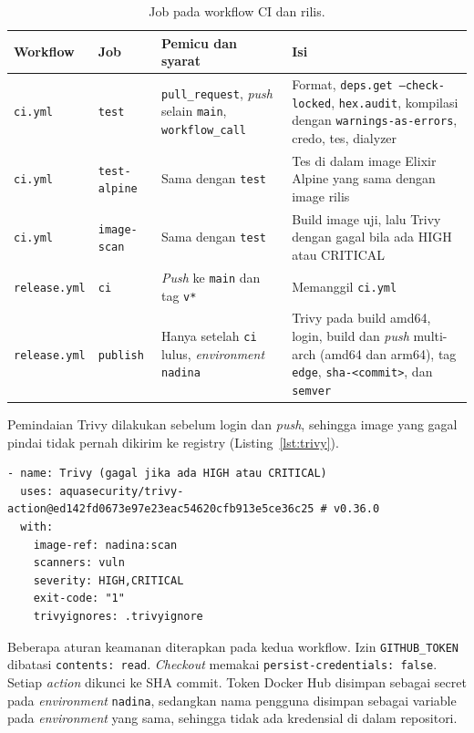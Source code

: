 \begin{table}[H]
\centering
{\small
\begin{tabular}{@{}p{2.6cm}p{2.6cm}p{4.4cm}p{5.4cm}@{}}
\toprule
Workflow & Job & Pemicu dan syarat & Isi \\
\midrule
\texttt{ci.yml} & \texttt{test} & \texttt{pull\_request}, \textit{push} selain \texttt{main}, \texttt{workflow\_call} &
Format, \texttt{deps.get --check-locked}, \texttt{hex.audit}, kompilasi dengan \texttt{warnings-as-errors}, credo, tes, dialyzer \\
\texttt{ci.yml} & \texttt{test-alpine} & Sama dengan \texttt{test} &
Tes di dalam image Elixir Alpine yang sama dengan image rilis \\
\texttt{ci.yml} & \texttt{image-scan} & Sama dengan \texttt{test} &
Build image uji, lalu Trivy~\cite{trivy} dengan gagal bila ada HIGH atau CRITICAL \\
\texttt{release.yml} & \texttt{ci} & \textit{Push} ke \texttt{main} dan tag \texttt{v*} &
Memanggil \texttt{ci.yml} \\
\texttt{release.yml} & \texttt{publish} & Hanya setelah \texttt{ci} lulus, \textit{environment} \texttt{nadina} &
Trivy pada build amd64, login, build dan \textit{push} multi-arch (amd64 dan arm64), tag \texttt{edge}, \texttt{sha-<commit>}, dan \texttt{semver} \\
\bottomrule
\end{tabular}}
\caption{Job pada workflow CI dan rilis.}
\label{tab:ci}
\end{table}

Pemindaian Trivy dilakukan sebelum login dan \textit{push}, sehingga image yang gagal pindai tidak
pernah dikirim ke registry (Listing~\ref{lst:trivy}).

\begin{lstlisting}[basicstyle=\ttfamily\footnotesize,caption={Gerbang Trivy pada job \texttt{publish}},label={lst:trivy},numbers=none]
- name: Trivy (gagal jika ada HIGH atau CRITICAL)
  uses: aquasecurity/trivy-action@ed142fd0673e97e23eac54620cfb913e5ce36c25 # v0.36.0
  with:
    image-ref: nadina:scan
    scanners: vuln
    severity: HIGH,CRITICAL
    exit-code: "1"
    trivyignores: .trivyignore
\end{lstlisting}

Beberapa aturan keamanan diterapkan pada kedua workflow. Izin \texttt{GITHUB\_TOKEN} dibatasi
\texttt{contents: read}. \textit{Checkout} memakai \texttt{persist-credentials: false}. Setiap
\textit{action} dikunci ke SHA commit. Token Docker Hub disimpan sebagai secret pada
\textit{environment} \texttt{nadina}, sedangkan nama pengguna disimpan sebagai variable pada
\textit{environment} yang sama, sehingga tidak ada kredensial di dalam repositori.

